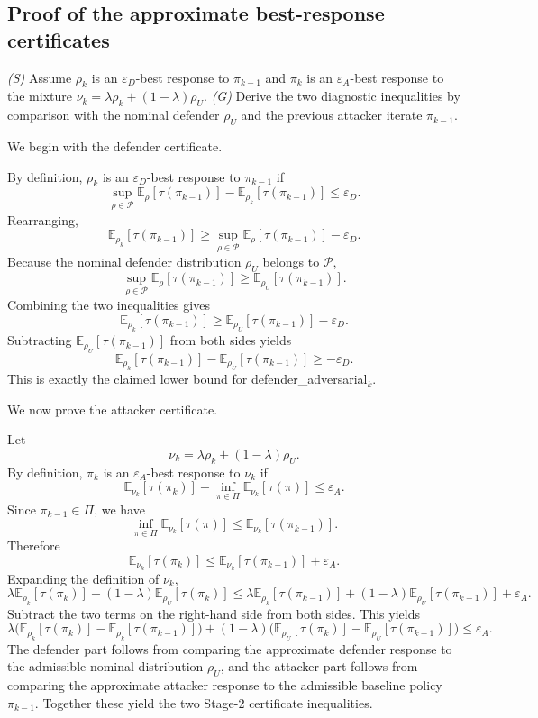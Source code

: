 \documentclass[11pt]{article}
\newcommand{\Pset}{\mathcal{P}}
\newcommand{\E}{\mathbb{E}}
\newcommand{\tauT}{\tau}
\begin{document}
\subsection{Proof of the approximate best-response certificates}

\noindent\textit{(S)} Assume $\rho_k$ is an $\varepsilon_D$-best response to $\pi_{k-1}$ and $\pi_k$ is an $\varepsilon_A$-best response to the mixture $\nu_k=\lambda\rho_k+(1-\lambda)\rho_U$. \textit{(G)} Derive the two diagnostic inequalities by comparison with the nominal defender $\rho_U$ and the previous attacker iterate $\pi_{k-1}$.

We begin with the defender certificate.

By definition, $\rho_k$ is an $\varepsilon_D$-best response to $\pi_{k-1}$ if
\[
\sup_{\rho\in\Pset}\E_{\rho}[\tauT(\pi_{k-1})]-\E_{\rho_k}[\tauT(\pi_{k-1})]\le \varepsilon_D.
\]
Rearranging,
\[
\E_{\rho_k}[\tauT(\pi_{k-1})]
\ge
\sup_{\rho\in\Pset}\E_{\rho}[\tauT(\pi_{k-1})]-\varepsilon_D.
\]
Because the nominal defender distribution $\rho_U$ belongs to $\Pset$,
\[
\sup_{\rho\in\Pset}\E_{\rho}[\tauT(\pi_{k-1})]\ge \E_{\rho_U}[\tauT(\pi_{k-1})].
\]
Combining the two inequalities gives
\[
\E_{\rho_k}[\tauT(\pi_{k-1})]\ge \E_{\rho_U}[\tauT(\pi_{k-1})]-\varepsilon_D.
\]
Subtracting $\E_{\rho_U}[\tauT(\pi_{k-1})]$ from both sides yields
\[
\E_{\rho_k}[\tauT(\pi_{k-1})]-\E_{\rho_U}[\tauT(\pi_{k-1})]\ge -\varepsilon_D.
\]
This is exactly the claimed lower bound for \textsf{defender\_adversarial}$_k$.

We now prove the attacker certificate.

Let
\[
\nu_k=\lambda \rho_k+(1-\lambda)\rho_U.
\]
By definition, $\pi_k$ is an $\varepsilon_A$-best response to $\nu_k$ if
\[
\E_{\nu_k}[\tauT(\pi_k)]-\inf_{\pi\in\Pi}\E_{\nu_k}[\tauT(\pi)]\le \varepsilon_A.
\]
Since $\pi_{k-1}\in\Pi$, we have
\[
\inf_{\pi\in\Pi}\E_{\nu_k}[\tauT(\pi)]\le \E_{\nu_k}[\tauT(\pi_{k-1})].
\]
Therefore
\[
\E_{\nu_k}[\tauT(\pi_k)]\le \E_{\nu_k}[\tauT(\pi_{k-1})]+\varepsilon_A.
\]
Expanding the definition of $\nu_k$,
\[
\lambda \E_{\rho_k}[\tauT(\pi_k)] + (1-\lambda)\E_{\rho_U}[\tauT(\pi_k)]
\le
\lambda \E_{\rho_k}[\tauT(\pi_{k-1})] + (1-\lambda)\E_{\rho_U}[\tauT(\pi_{k-1})]+\varepsilon_A.
\]
Subtract the two terms on the right-hand side from both sides. This yields
\[
\lambda\Big(\E_{\rho_k}[\tauT(\pi_k)]-\E_{\rho_k}[\tauT(\pi_{k-1})]\Big)
+
(1-\lambda)\Big(\E_{\rho_U}[\tauT(\pi_k)]-\E_{\rho_U}[\tauT(\pi_{k-1})]\Big)
\le \varepsilon_A.
\]
The defender part follows from comparing the approximate defender response to the admissible nominal distribution $\rho_U$, and the attacker part follows from comparing the approximate attacker response to the admissible baseline policy $\pi_{k-1}$. Together these yield the two Stage-2 certificate inequalities.
\end{document}

